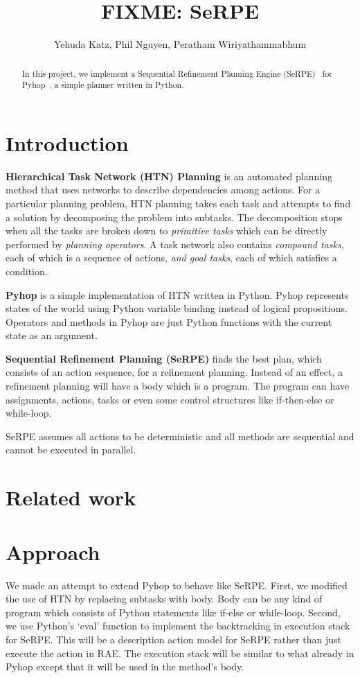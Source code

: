 \documentclass[11pt]{article} %
\title{FIXME: SeRPE}
\author{Yehuda Katz, Phil Nguyen, Peratham Wiriyathammabhum}
\begin{document}
\maketitle

\begin{abstract}
In this project, we implement a Sequential Refinement Planning Engine
(SeRPE)~\cite{serpe-draft} for Pyhop~\cite{pyhop},
a simple planner written in Python.
\end{abstract}

\section{Introduction}

\textbf{Hierarchical Task Network (HTN) Planning} is an automated planning method that uses networks
to describe dependencies among actions.
For a particular planning problem, HTN planning takes each task and attempts to find a solution
by decomposing the problem into subtasks. The decomposition stops when all the tasks are broken down to \textit{primitive tasks} which can be directly performed by \textit{planning operators}.
A task network also contains 
\textit{compound tasks}, each of which is a sequence of actions,
\textit{and goal tasks}, each of which satisfies a condition.

\textbf{Pyhop} is a simple implementation of HTN written in Python. 
Pyhop represents states of the world using Python variable binding
 instead of logical propositions. Operators and methods in Pyhop are
 just Python functions with the current state as an argument.

\textbf{Sequential Refinement Planning (SeRPE)} finds the best plan,
 which consists of an action sequence, for a refinement planning. 
Instead of an effect, a refinement planning will have a body which
 is a program. The program can have assignments, actions, tasks or
 even some control structures like if-then-else or while-loop.

SeRPE assumes all actions to be deterministic and all methods are 
sequential and cannot be executed in parallel.

\section{Related work}

\section{Approach}
We made an attempt to extend Pyhop to behave like SeRPE. 
First, we modified the use of HTN by replacing subtasks with 
body. Body can be any kind of program which consists of
 Python statements like if-else or while-loop.
Second, we use Python's `eval' function to implement the 
backtracking in execution stack for SeRPE. This will be a 
description action model for SeRPE rather than just execute
 the action in RAE. The execution stack will be similar to what
 already in Pyhop except that it will be used in the method's body.
\end{document}
